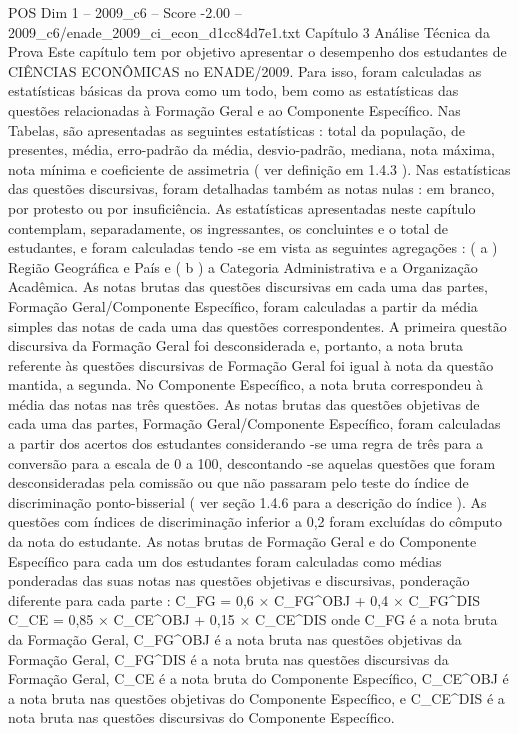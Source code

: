 \begin{textsample}{POS Dim 1 – 2009\_c6 – Score -2.00 – 2009\_c6/enade\_2009\_ci\_econ\_d1cc84d7e1.txt}  \label{ex:f1_pos_225}
Capítulo 3 Análise Técnica da Prova Este capítulo tem por objetivo apresentar o desempenho dos estudantes de CIÊNCIAS ECONÔMICAS no ENADE/2009.
Para isso, foram calculadas as estatísticas básicas da prova como um todo, bem como as estatísticas das questões relacionadas à Formação Geral e ao Componente Específico.
Nas Tabelas, são apresentadas as seguintes estatísticas : total da população, de presentes, média, erro-padrão da média, desvio-padrão, mediana, nota máxima, nota mínima e coeficiente de assimetria ( ver definição em 1.4.3 ).
Nas estatísticas das questões discursivas, foram detalhadas também as notas nulas : em branco, por protesto ou por insuficiência.
As estatísticas apresentadas neste capítulo contemplam, separadamente, os ingressantes, os concluintes e o total de estudantes, e foram calculadas tendo -se em vista as seguintes agregações : ( a ) Região Geográfica e País e ( b ) a Categoria Administrativa e a Organização Acadêmica.
As notas brutas das questões discursivas em cada uma das partes, Formação Geral/Componente Específico, foram calculadas a partir da média simples das notas de cada uma das questões correspondentes.
A primeira questão discursiva da Formação Geral foi desconsiderada e, portanto, a nota bruta referente às questões discursivas de Formação Geral foi igual à nota da questão mantida, a segunda.
No Componente Específico, a nota bruta correspondeu à média das notas nas três questões.
As notas brutas das questões objetivas de cada uma das partes, Formação Geral/Componente Específico, foram calculadas a partir dos acertos dos estudantes considerando -se uma regra de três para a conversão para a escala de 0 a 100, descontando -se aquelas questões que foram desconsideradas pela comissão ou que não passaram pelo teste do índice de discriminação ponto-bisserial ( ver seção 1.4.6 para a descrição do índice ).
As questões com índices de discriminação inferior a 0,2 foram excluídas do cômputo da nota do estudante.
As notas brutas de Formação Geral e do Componente Específico para cada um dos estudantes foram calculadas como médias ponderadas das suas notas nas questões objetivas e discursivas, ponderação diferente para cada parte : C\_FG = 0,6 × C\_FG\textasciicircum{}OBJ + 0,4 × C\_FG\textasciicircum{}DIS C\_CE = 0,85 × C\_CE\textasciicircum{}OBJ + 0,15 × C\_CE\textasciicircum{}DIS onde C\_FG é a nota bruta da Formação Geral, C\_FG\textasciicircum{}OBJ é a nota bruta nas questões objetivas da Formação Geral, C\_FG\textasciicircum{}DIS é a nota bruta nas questões discursivas da Formação Geral, C\_CE é a nota bruta do Componente Específico, C\_CE\textasciicircum{}OBJ é a nota bruta nas questões objetivas do Componente Específico, e C\_CE\textasciicircum{}DIS é a nota bruta nas questões discursivas do Componente Específico.

\end{textsample}
